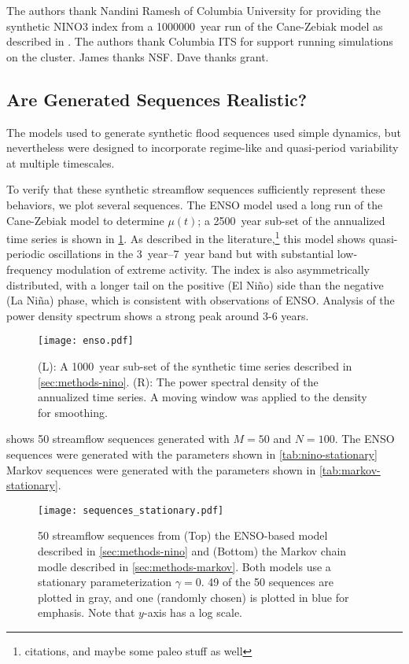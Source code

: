 \documentclass[12pt]{article}
\begin{document}
The authors thank Nandini Ramesh of Columbia University for providing the synthetic NINO3 index from a \SI{1000000}{year} run of the Cane-Zebiak model as described in \citet{Ramesh2017}.
The authors thank Columbia ITS for support running simulations on the cluster.
James thanks NSF.
Dave thanks grant.

\subsection{Are Generated Sequences Realistic?\label{sec:sequence-realistic}}

The models used to generate synthetic flood sequences used simple dynamics, but nevertheless were designed to incorporate regime-like and quasi-period variability at multiple timescales.

To verify that these synthetic streamflow sequences sufficiently represent these behaviors, we plot several sequences.
The ENSO model used a long run of the Cane-Zebiak model \citep{Zebiak1987,Ramesh2017} to determine \(\mu(t)\); a \SI{2500}{year} sub-set of the annualized time series is shown in \cref{fig:enso-ts}.
As described in the literature,\footnote{citations, and maybe some paleo stuff as well} this model shows quasi-periodic oscillations in the \SIrange{3}{7}{year} band but with substantial low-frequency modulation of extreme activity.
The index is also asymmetrically distributed, with a longer tail on the positive (El Ni\~{n}o) side than the negative (La Ni\~{n}a) phase, which is consistent with observations of ENSO.
Analysis of the power density spectrum shows a strong peak around 3-6 years.
\begin{figure}
  \texttt{[image: enso.pdf]}
  \caption{
    (L): A \SI{1000}{year} sub-set of the synthetic time series described in \cref{sec:methods-nino}.
    (R): The power spectral density of the annualized time series. A moving window was applied to the density for smoothing.\label{fig:enso-ts}
  }
\end{figure}

 shows 50 streamflow sequences generated with $M=50$ and $N=100$.
The ENSO sequences were generated with the parameters shown in \cref{tab:nino-stationary} Markov sequences were generated with the parameters shown in \cref{tab:markov-stationary}.
\begin{figure}[b]
  \texttt{[image: sequences\_stationary.pdf]}  
  \caption{
    50 streamflow sequences from (Top) the ENSO-based model described in \cref{sec:methods-nino} and (Bottom) the Markov chain modle described in \cref{sec:methods-markov}.
    Both models use a stationary parameterization $\gamma=0$.
    49 of the 50 sequences are plotted in gray, and one (randomly chosen) is plotted in blue for emphasis.
    Note that $y$-axis has a log scale.\label{fig:stationary-sequences}
  }
\end{figure}
\end{document}
